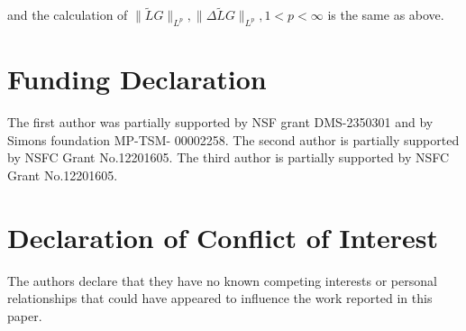 \documentclass{amsart}
\theoremstyle{plain}
\theoremstyle{remark}
\numberwithin{equation}{section}
\begin{document}
and the calculation of $\|\tilde{L}G\|_{L^p}, \|\Delta \tilde{L}G\|_{L^p}, 1<p<\infty$ is  the same  as above.

\section*{Funding Declaration}The first author was partially supported by NSF grant DMS-2350301 and by Simons foundation MP-TSM-
00002258. The second author is partially supported by NSFC Grant No.12201605. The third author is partially supported by NSFC Grant No.12201605.

\section*{Declaration of Conflict of Interest}

The authors declare that they have no known competing  interests or personal relationships that could have appeared to influence the work reported in this paper.
\end{document}
